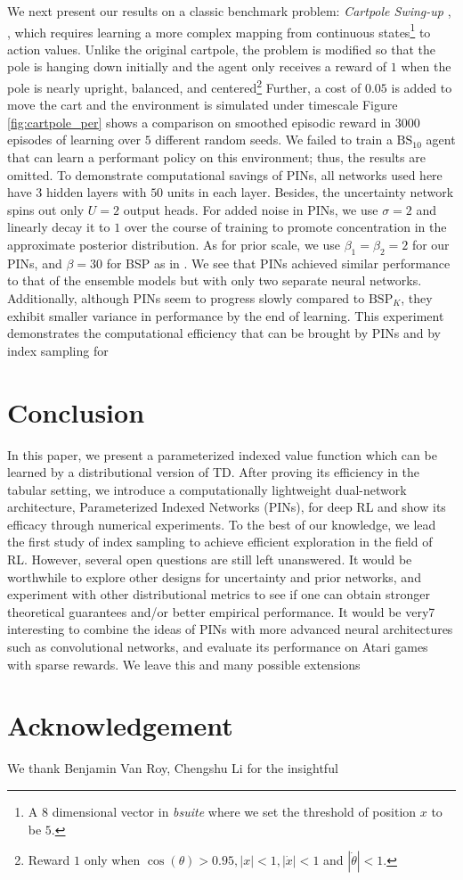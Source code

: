 \documentclass[letterpaper]{article} %
\newcommand{\abs}[1]{\left|#1\right|}
\theoremstyle{definition}
\begin{document}
We next present our results on a classic benchmark problem: \textit{Cartpole Swing-up} \cite{sutton2018reinforcement}, \cite{osband2019bsuite}, which requires learning a more complex mapping from continuous states\footnote{A $8$ dimensional vector in \textit{bsuite} where we set the threshold of position $x$ to be $5$.} to action values. Unlike the original cartpole, the problem is modified so that the pole is hanging down initially and the agent only receives a reward of $1$ when the pole is nearly upright, balanced, and centered\footnote{Reward $1$ only when $\cos(\theta) > 0.95, \abs{x} < 1, \abs{\Dot{x}} < 1$ and $|\Dot{\theta}| < 1$.} Further, a cost of $0.05$ is added to move the cart and the environment is simulated under timescale  Figure \ref{fig:cartpole_per} shows a comparison on smoothed episodic reward in $3000$ episodes of learning over $5$ different random seeds. We failed to train a $\mathrm{BS}_{10}$ agent that can learn a performant policy on this environment; thus, the results are omitted. To demonstrate computational savings of PINs, all networks used here have $3$ hidden layers with $50$ units in each layer. Besides, the uncertainty network spins out only $U=2$ output heads. For added noise in PINs, we use $\sigma=2$ and linearly decay it to $1$ over the course of training to promote concentration in the approximate posterior distribution. As for prior scale, we use $\beta_1=\beta_2=2$ for our PINs, and $\beta=30$ for BSP as in \cite{osband2018randomized}. We see that PINs achieved similar performance to that of the ensemble models but with only two separate neural networks. Additionally, although PINs seem to progress slowly compared to $\mathrm{BSP}_K$, they exhibit smaller variance in performance by the end of learning. This experiment demonstrates the computational efficiency that can be brought by PINs and by index sampling for

\vspace{-0.89mm}
\vspace{-1.54mm}
\section{Conclusion}

In this paper, we present a parameterized indexed value function which can be learned by a distributional version of TD. After proving its efficiency in the tabular setting, we introduce a computationally lightweight dual-network architecture, Parameterized Indexed Networks (PINs), for deep RL and show its efficacy through numerical experiments. To the best of our knowledge, we lead the first study of index sampling to achieve efficient exploration in the field of RL.  However, several open questions are still left unanswered. It would be worthwhile to explore other designs for uncertainty and prior networks, and experiment with other distributional metrics to see if one can obtain stronger theoretical guarantees and/or better empirical performance. It would be very7 interesting to combine the ideas of PINs with more advanced neural architectures such as convolutional networks, and evaluate its performance on Atari games with sparse rewards. We leave this and many possible extensions

\section{Acknowledgement}
We thank Benjamin Van Roy, Chengshu Li for the insightful

\medskip

\clearpage


\end{document}
